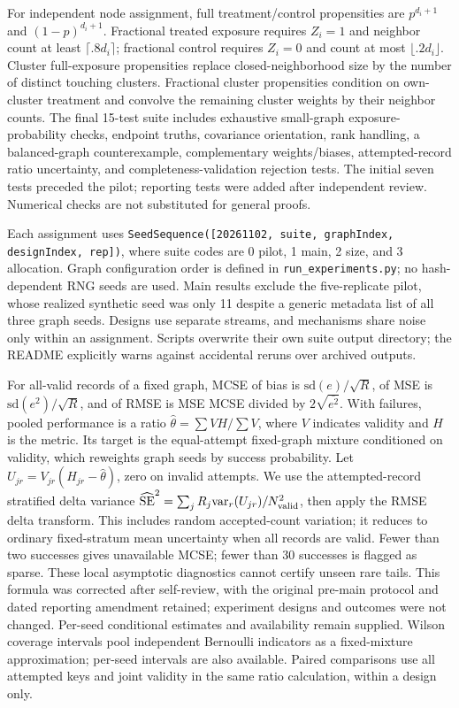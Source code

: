 \documentclass{article}
\begin{document}
For independent node assignment, full treatment/control propensities are $p^{d_i+1}$ and $(1-p)^{d_i+1}$. Fractional treated exposure requires $Z_i=1$ and neighbor count at least $\lceil .8d_i\rceil$; fractional control requires $Z_i=0$ and count at most $\lfloor .2d_i\rfloor$. Cluster full-exposure propensities replace closed-neighborhood size by the number of distinct touching clusters. Fractional cluster propensities condition on own-cluster treatment and convolve the remaining cluster weights by their neighbor counts. The final 15-test suite includes exhaustive small-graph exposure-probability checks, endpoint truths, covariance orientation, rank handling, a balanced-graph counterexample, complementary weights/biases, attempted-record ratio uncertainty, and completeness-validation rejection tests. The initial seven tests preceded the pilot; reporting tests were added after independent review. Numerical checks are not substituted for general proofs.

Each assignment uses \texttt{SeedSequence([20261102, suite, graphIndex, designIndex, rep])}, where suite codes are 0 pilot, 1 main, 2 size, and 3 allocation. Graph configuration order is defined in \texttt{run\_experiments.py}; no hash-dependent RNG seeds are used. Main results exclude the five-replicate pilot, whose realized synthetic seed was only 11 despite a generic metadata list of all three graph seeds. Designs use separate streams, and mechanisms share noise only within an assignment. Scripts overwrite their own suite output directory; the README explicitly warns against accidental reruns over archived outputs.

For all-valid records of a fixed graph, MCSE of bias is $\mathrm{sd}(e)/\sqrt{R}$, of MSE is $\mathrm{sd}(e^2)/\sqrt{R}$, and of RMSE is MSE MCSE divided by $2\sqrt{\overline{e^2}}$. With failures, pooled performance is a ratio $\widehat\theta=\sum VH/\sum V$, where $V$ indicates validity and $H$ is the metric. Its target is the equal-attempt fixed-graph mixture conditioned on validity, which reweights graph seeds by success probability. Let $U_{jr}=V_{jr}(H_{jr}-\widehat\theta)$, zero on invalid attempts. We use the attempted-record stratified delta variance $\widehat{\mathrm{SE}}^2=\sum_j R_j\mathrm{var}_r(U_{jr})/N_{\rm valid}^2$, then apply the RMSE delta transform. This includes random accepted-count variation; it reduces to ordinary fixed-stratum mean uncertainty when all records are valid. Fewer than two successes gives unavailable MCSE; fewer than 30 successes is flagged as sparse. These local asymptotic diagnostics cannot certify unseen rare tails. This formula was corrected after self-review, with the original pre-main protocol and dated reporting amendment retained; experiment designs and outcomes were not changed. Per-seed conditional estimates and availability remain supplied. Wilson coverage intervals pool independent Bernoulli indicators as a fixed-mixture approximation; per-seed intervals are also available. Paired comparisons use all attempted keys and joint validity in the same ratio calculation, within a design only.
\end{document}
